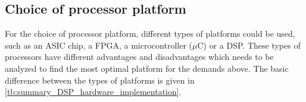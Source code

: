 %
%
%
%
%
%
%
%

\subsection*{Choice of processor platform}
For the choice of processor platform, different types of platforms could be used, such as an ASIC chip, a \gls{FPGA}, a microcontroller ($\mu$C) or a \gls{DSP}. These types of processors have different advantages and disadvantages which needs to be analyzed to find the most optimal platform for the demands above. The basic difference between the types of platforms is given in \autoref{tb:summary_DSP_hardware_implementation}. 

